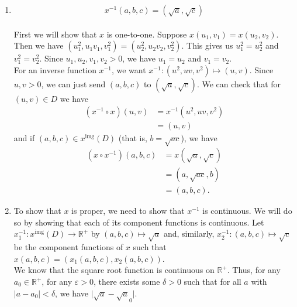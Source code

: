 \documentclass[12 pt, letterpaper]{hmcpset}
\begin{document}
\begin{solution}
	\begin{enumerate}
		\item
			\[
				\boxed{
					x^{-1}(a, b, c) = (\sqrt a, \sqrt c)
				}
			\] \\
			First we will show that $x$ is one-to-one. Suppose $x(u_{1}, v_{1}) = x(u_{2}, v_2)$. Then we have $(u_{1}^{2}, u_{1} v_{1}, v_{1}^{2}) = (u_{2}^{2}, u_{2} v_2, v_{2}^{2})$. This gives us $u_{1}^{2} = u_2^{2}$ and $v_{1}^{2} = v_{2}^{2}$. Since $u_{1}, u_{2}, v_{1}, v_{2} > 0$, we have $u_{1} = u_{2}$ and $v_{1} = v_{2}$. \\

			For an inverse function $x^{-1}$, we want $x^{-1} : (u^{2}, uv, v^{2}) \mapsto (u, v)$. Since $u, v > 0$, we can just send $(a, b, c)$ to $(\sqrt a, \sqrt c)$. We can check that for $(u, v) \in D$ we have
			\[
				\begin{split}
					(x^{-1} \circ x) (u, v) & = x^{-1}(u^{2}, uv, v^{2}) \\
							      & = (u, v)
				\end{split}
			\]
			and if $(a, b, c) \in x^{\text{img}}(D)$ (that is, $b = \sqrt{ac}$), we have
			\[
				\begin{split}
					(x \circ x^{-1})(a, b, c) & = x(\sqrt a, \sqrt c) \\
								  & = (a, \sqrt{ac}, b) \\
								  & = (a, b, c).
				\end{split}
			\]
		\item
			To show that $x$ is proper, we need to show that $x^{-1}$ is continuous. We will do so by showing that each of its component functions is continuous. Let $x_{1}^{-1} : x^{\text{img}}(D) \to \mathbb{R}^{+}$ by $(a, b, c) \mapsto \sqrt a$ and, similarly, $x_{2}^{-1} : (a, b, c) \mapsto \sqrt c$ be the component functions of $x$ such that $x(a, b, c) = (x_{1}(a, b, c), x_{2}(a, b, c))$. \\
			
			We know that the square root function is continuous on $\mathbb{R}^{+}$. Thus, for any $a_{0} \in \mathbb{R}^{+}$, for any $\varepsilon > 0$, there exists some $\delta > 0$ such that for all $a$ with $\lvert a - a_{0} \rvert < \delta$, we have $\lvert \sqrt a - \sqrt a_{0} \rvert$. \\


\end{enumerate}
\end{solution}
\end{document}
